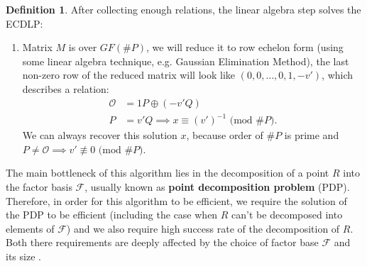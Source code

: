 \documentclass[thesis=M,english]{FITthesis}[2012/10/20]
\theoremstyle{remark}
\theoremstyle{definition}
\newtheorem{DF}{Definition}[section]
\begin{document}
\begin{DF}
\noindent After collecting enough relations, the linear algebra step solves the ECDLP:
\begin{enumerate}
\item Matrix $M$ is over $GF(\#P)$, we will reduce it to row echelon form (using some linear algebra technique, e.g. Gaussian Elimination Method), the last non-zero row of the reduced matrix will look like $(0,0,\ldots, 0, 1, -v')$, which describes a relation:
\begin{align*}
\mathcal{O}  &= 1P \oplus (-v'Q) \\
P &= v'Q \implies x \equiv (v')^{-1} \text{ (mod $\#P$)}.
\end{align*}
We can always recover this solution $x$, because order of $\#P$ is prime and $P \neq \mathcal{O} \implies v' \not\equiv 0 \text{ (mod $\#P$)}$.
\end{enumerate}
\end{DF}
The main bottleneck of this algorithm lies in the decomposition of a point $R$ into the factor basis $\mathcal{F}$, usually known as \textbf{point decomposition problem} (PDP). Therefore, in order for this algorithm to be efficient, we require the solution of the PDP to be efficient (including the case when $R$ can't be decomposed into elements of $\mathcal{F}$) and we also require high success rate of the decomposition of $R$. Both there requirements are deeply affected by the choice of factor base $\mathcal{F}$ and its size \cite{amadori17}. \\ 
\end{document}

